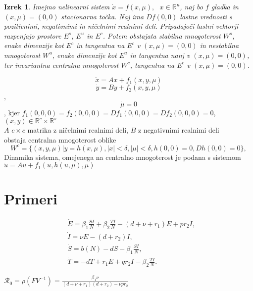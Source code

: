 \documentclass[11pt]{beamer}
\newcommand{\R}{\mathcal R}
\newtheorem{izrek}{Izrek}
\begin{document}
\begin{frame}
    \begin{izrek}\label{izrekcm}
        Imejmo nelinearni sistem \(\dot{x}=f(x,\mu),\textrm{ }x\in\mathbb{R}^n\), naj bo \(f\) gladka 
        in \((x,\mu)=(0,0)\) stacionarna točka. Naj ima \(Df(0,0)\) lastne vrednosti s pozitivnimi, negativnimi in 
        ničelnimi realnimi deli. Pripadajoči lastni vektorji razpenjajo prostore \(E^s\), \(E^u\) in \(E^c\). 
        Potem obstajata stabilna mnogoterost \(W^s\), enake dimenzije kot \(E^c\) in tangentna na \(E^c\) v \((x,\mu)=(0,0)\) in nestabilna mnogoterost \(W^u\),
        enake dimenzije kot \(E^u\) in tangentna nanj v \((x,\mu)=(0,0)\), ter invariantna centralna mnogoterost \(W^c\), 
        tangentna na \(E^c\) v \((x,\mu)=(0,0)\).
    \end{izrek}
\end{frame}

\begin{frame}
    \[\dot{x}=Ax+f_1(x,y,\mu)\]
\[\dot{y}=By+f_2(x,y,\mu)\],
\[\dot{\mu}=0\],
kjer \(f_1(0,0,0)=f_2(0,0,0)=Df_1(0,0,0)=Df_2(0,0,0)=0\), \((x,y)\in \mathbb{R}^c\times \mathbb{R}^s\)\\
\(A\) \(c \times c\) matrika z ničelnimi realnimi deli, \(B\) z negativnimi realnimi deli\\
obstaja centralna mnogoterost oblike
\[W^c=\{(x,y,\mu)|y=h(x,\mu), |x|<\delta, |\mu|<\delta, h(0,0)=0, Dh(0,0)=0\},\]
Dinamika sistema, omejenega na centralno mnogoterost je podana s sistemom 
\(\dot{u}=Au+f_1(u,h(u,\mu),\mu)\)
\end{frame}

\section{Primeri}
\begin{frame}
    \begin{align*}
        &\dot{E}=\beta_1\frac{SI}{N}+\beta_2\frac{TI}{N}-(d+\nu+r_1)E+pr_2I,\\
        &\dot{I}=\nu E -(d+r_2)I,\\
        &\dot{S}=b(N)-dS-\beta_1\frac{SI}{N},\\
        &\dot{T}=-dT+r_1E+qr_2I-\beta_2\frac{TI}{N}.
        \end{align*}
\end{frame}

\begin{frame}
    \(\R_0=\rho(FV^{-1})=\frac{\beta_1\nu}{(d+\nu+r_1)(d+r_2)-\nu pr_2}\)
\end{frame}
\end{document}

